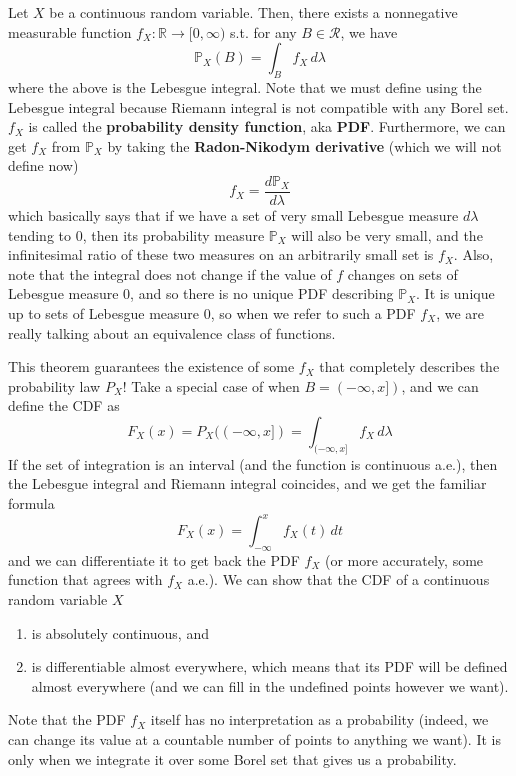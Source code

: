 \documentclass{article}
\begin{document}
      \begin{theorem}
        Let $X$ be a continuous random variable. Then, there exists a nonnegative measurable function $f_X : \mathbb{R} \longrightarrow [0, \infty)$ s.t. for any $B \in \mathcal{R}$, we have 
        \begin{equation}
          \mathbb{P}_X (B) = \int_B f_X \, d\lambda
        \end{equation}
        where the above is the Lebesgue integral. Note that we must define using the Lebesgue integral because Riemann integral is not compatible with any Borel set. $f_X$ is called the \textbf{probability density function}, aka \textbf{PDF}. Furthermore, we can get $f_X$ from $\mathbb{P}_X$ by taking the \textbf{Radon-Nikodym derivative} (which we will not define now)
        \begin{equation}
          f_X = \frac{d \mathbb{P}_X}{d \lambda}
        \end{equation}
        which basically says that if we have a set of very small Lebesgue measure $d \lambda$ tending to $0$, then its probability measure $\mathbb{P}_X$ will also be very small, and the infinitesimal ratio of these two measures on an arbitrarily small set is $f_X$. Also, note that the integral does not change if the value of $f$ changes on sets of Lebesgue measure $0$, and so there is no unique PDF describing $\mathbb{P}_X$. It is unique up to sets of Lebesgue measure $0$, so when we refer to such a PDF $f_X$, we are really talking about an equivalence class of functions. 
      \end{theorem}

      This theorem guarantees the existence of some $f_X$ that completely describes the probability law $P_X$! Take a special case of when $B = (-\infty, x])$, and we can define the CDF as 
      \begin{equation}
        F_X (x) = P_X ((-\infty, x]) = \int_{(-\infty, x]} f_X \, d\lambda
      \end{equation}
      If the set of integration is an interval (and the function is continuous a.e.), then the Lebesgue integral and Riemann integral coincides, and we get the familiar formula 
      \begin{equation}
        F_X (x) = \int_{-\infty}^x f_X (t)\,dt
      \end{equation}
      and we can differentiate it to get back the PDF $f_X$ (or more accurately, some function that agrees with $f_X$ a.e.). We can show that the CDF of a continuous random variable $X$
      \begin{enumerate}
        \item is absolutely continuous, and 
        \item is differentiable almost everywhere, which means that its PDF will be defined almost everywhere (and we can fill in the undefined points however we want). 
      \end{enumerate}
      Note that the PDF $f_X$ itself has no interpretation as a probability (indeed, we can change its value at a countable number of points to anything we want). It is only when we integrate it over some Borel set that gives us a probability. 
\end{document}
